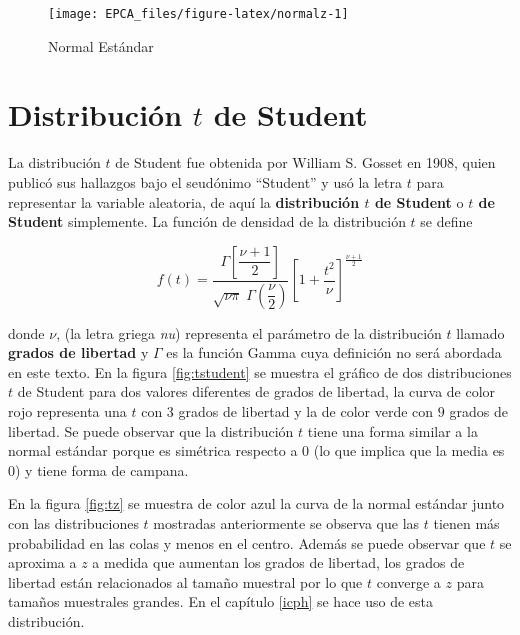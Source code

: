 \documentclass[
]{krantz}
\begin{document}
\begin{figure}[h!]

{\centering \texttt{[image: EPCA\_files/figure-latex/normalz-1]} 

}

\caption{Normal Estándar}\label{fig:normalz}
\end{figure}

\hypertarget{distribucion-t-de-student}{%
\section{\texorpdfstring{Distribución \(t\) de Student}{Distribución t de Student}}\label{distribucion-t-de-student}}

La distribución \(t\) de Student fue obtenida por William S. Gosset en 1908, quien publicó sus hallazgos bajo el seudónimo ``Student'' y usó la letra \(t\) para representar la variable aleatoria, de aquí la \textbf{distribución \(t\) de Student} o \textbf{\(t\) de Student} simplemente. La función de densidad de la distribución \(t\) se define

\begin{equation}
f\left(t\right)=\dfrac{\Gamma\left[\dfrac{\nu+1}{2}\right]}{\sqrt{\nu \pi} \; \Gamma\left(\dfrac{\nu}{2}\right)}\left[1 + \dfrac{t^2}{\nu} \right]^{\frac{\nu+1}{2}}
\label{eq:studentpdf}
\end{equation}

donde \(\nu\), (la letra griega \emph{nu}) representa el parámetro de la distribución \(t\) llamado \textbf{grados de libertad} y \(\Gamma\) es la función Gamma cuya definición no será abordada en este texto.
En la figura \ref{fig:tstudent} se muestra el gráfico de dos distribuciones \(t\) de Student para dos valores diferentes de grados de libertad, la curva de color rojo representa una \(t\) con 3 grados de libertad y la de color verde con \(9\) grados de libertad. Se puede observar que la distribución \(t\) tiene una forma similar a la normal estándar porque es simétrica respecto a \(0\) (lo que implica que la media es \(0\)) y tiene forma de campana.

En la figura \ref{fig:tz} se muestra de color azul la curva de la normal estándar junto con las distribuciones \(t\) mostradas anteriormente se observa que las \(t\) tienen más probabilidad en las colas y menos en el centro. Además se puede observar que \(t\) se aproxima a \(z\) a medida que aumentan los grados de libertad, los grados de libertad están relacionados al tamaño muestral por lo que \(t\) converge a \(z\) para tamaños muestrales grandes. En el capítulo \ref{icph} se hace uso de esta distribución.
\end{document}
